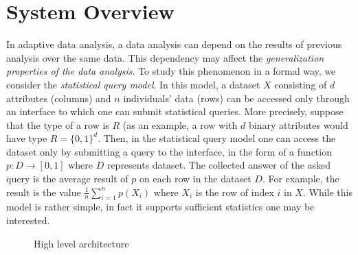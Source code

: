 \documentclass[a4paper,11pt]{article}
\newcommand{\THESYSTEM}{\textsf{AdaptFun}}
\begin{document}
\section{System Overview}
In adaptive data analysis, a data analysis can depend on the results of
previous analysis over the same data. This dependency may affect the
\emph{generalization properties of the data analysis}. To study this phenomenon
in a formal way, we consider the \emph{statistical query
  model}. In this model, a dataset $X$ consisting of $d$ attributes (columns) and $n$
individuals' data (rows) can be accessed only through an interface to
which one can submit statistical queries. More precisely, suppose that
the type of a row is $R$ (as an example, a row with $d$ binary
attributes would have type $R=\{0,1\}^d$. Then, in the statistical
query model one can access the dataset only by submitting a query to
the interface, in
the form of a function
$p:D\to [0,1] $ where $D$ represents dataset. The collected answer of
the asked query is the average result of $p$ on each row in the
dataset $D$. For example, the result is the
value $\frac{1}{n}\sum_{i=1}^n p(X_i)$ where
$X_i$ is the row of index $i$ in $X$. While this model is rather
simple, in fact it supports sufficient statistics one may be
interested.
\begin{figure}
    \centering    {} 
    \caption{High level architecture}
    \label{fig:structure}
\end{figure}

 
\end{document}
